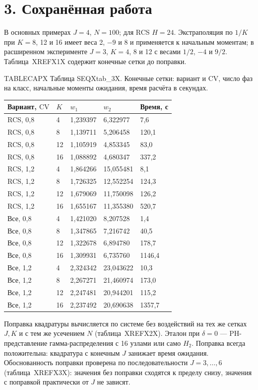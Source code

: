 \section*{3. Сохранённая работа}
В основных примерах \(J=4\), \(N=100\); для RCS \(H=24\). Экстраполяция по \(1/K\) при \(K=8\), 12 и 16 имеет веса 2, \(-9\) и 8 и применяется к начальным моментам; в расширенном эксперименте \(J=3\), \(K=4\), 8 и 12 с весами \(1/2\), \(-4\) и \(9/2\). Таблица~XREFX1X содержит конечные сетки до поправки.

\noindent TABLECAPX Таблица SEQXtab_3X. Конечные сетки: вариант и \(\mathrm{CV}\), число фаз на класс, начальные моменты ожидания, время расчёта в секундах.\par

\setlength{\tabcolsep}{2pt}
\begin{tabular}{p{4.44cm}p{1.13cm}p{3.31cm}p{3.31cm}p{2.46cm}}
\toprule
Вариант, $\mathrm{CV}$ & $K$ & $w_1$ & $w_2$ & Время, с \\
\midrule
RCS, 0,8 & 4 & 1,239397 & 6,322977 & 7,6 \\
RCS, 0,8 & 8 & 1,139711 & 5,206458 & 120,1 \\
RCS, 0,8 & 12 & 1,105919 & 4,853345 & 83,0 \\
RCS, 0,8 & 16 & 1,088892 & 4,680347 & 337,2 \\
RCS, 1,2 & 4 & 1,864266 & 15,055481 & 8,1 \\
RCS, 1,2 & 8 & 1,726325 & 12,552254 & 124,3 \\
RCS, 1,2 & 12 & 1,679069 & 11,750098 & 126,2 \\
RCS, 1,2 & 16 & 1,655167 & 11,355380 & 520,7 \\
Все, 0,8 & 4 & 1,421020 & 8,207528 & 1,4 \\
Все, 0,8 & 8 & 1,347865 & 7,216742 & 40,5 \\
Все, 0,8 & 12 & 1,322678 & 6,894780 & 178,7 \\
Все, 0,8 & 16 & 1,309931 & 6,735760 & 1146,4 \\
Все, 1,2 & 4 & 2,324342 & 23,043622 & 10,3 \\
Все, 1,2 & 8 & 2,267271 & 21,460974 & 173,0 \\
Все, 1,2 & 12 & 2,247481 & 20,944201 & 115,2 \\
Все, 1,2 & 16 & 2,237492 & 20,690638 & 1357,7 \\
\bottomrule
\end{tabular}




Поправка квадратуры вычисляется по системе без воздействий на тех же сетках \(J,K\) и с тем же усечением \(N\) (таблица~XREFX2X). Эталон при \(\delta=0\) --- PH-представление гамма-распределения с 16 узлами или само \(H_2\). Поправка всегда положительна: квадратура с конечным \(J\) занижает время ожидания. Обоснованность поправки проверена по последовательности \(J=3,\ldots,6\) (таблица~XREFX3X): значения без поправки сходятся к пределу снизу, значения с поправкой практически от \(J\) не зависят.

